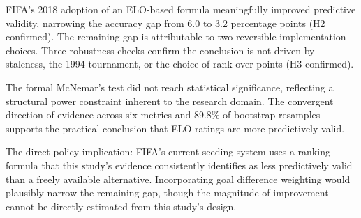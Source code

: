 \documentclass[12pt, a4paper]{article}
\begin{document}
FIFA's 2018 adoption of an ELO-based formula meaningfully improved predictive validity,
narrowing the accuracy gap from 6.0 to 3.2 percentage points (H2 confirmed). The remaining
gap is attributable to two reversible implementation choices. Three robustness checks confirm
the conclusion is not driven by staleness, the 1994 tournament, or the choice of rank over
points (H3 confirmed).

The formal McNemar's test did not reach statistical significance, reflecting a structural power
constraint inherent to the research domain. The convergent direction of evidence across six
metrics and 89.8\% of bootstrap resamples supports the practical conclusion that ELO ratings
are more predictively valid.

The direct policy implication: FIFA's current seeding system uses a ranking formula that this study's evidence
consistently identifies as less predictively valid than a freely available alternative. Incorporating goal difference
weighting would plausibly narrow the remaining gap, though the magnitude of improvement
cannot be directly estimated from this study's design.

\newpage

\end{document}
